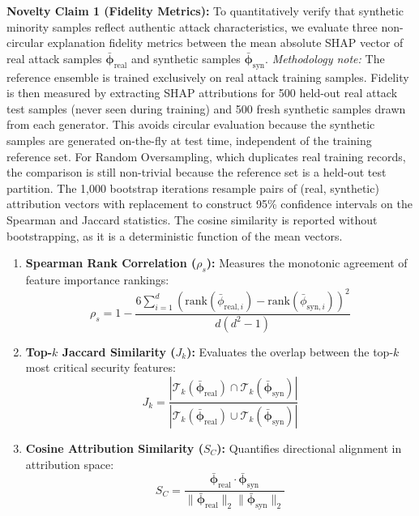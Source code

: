 \documentclass[journal]{IEEEtran}
\begin{document}
\textbf{Novelty Claim 1 (Fidelity Metrics):} To quantitatively verify that synthetic minority samples reflect authentic attack characteristics, we evaluate three non-circular explanation fidelity metrics between the mean absolute SHAP vector of real attack samples $\bar{\boldsymbol{\phi}}_{\text{real}}$ and synthetic samples $\bar{\boldsymbol{\phi}}_{\text{syn}}$. \textit{Methodology note:} The reference ensemble is trained exclusively on real attack training samples. Fidelity is then measured by extracting SHAP attributions for 500 held-out real attack test samples (never seen during training) and 500 fresh synthetic samples drawn from each generator. This avoids circular evaluation because the synthetic samples are generated on-the-fly at test time, independent of the training reference set. For Random Oversampling, which duplicates real training records, the comparison is still non-trivial because the reference set is a held-out test partition. The 1,000 bootstrap iterations resample pairs of (real, synthetic) attribution vectors with replacement to construct 95\% confidence intervals on the Spearman and Jaccard statistics. The cosine similarity is reported without bootstrapping, as it is a deterministic function of the mean vectors.
\begin{enumerate}
    \item \textbf{Spearman Rank Correlation ($\rho_s$):} Measures the monotonic agreement of feature importance rankings:
    \begin{equation}
    \rho_s = 1 - \frac{6 \sum_{i=1}^d (\text{rank}(\bar{\phi}_{\text{real}, i}) - \text{rank}(\bar{\phi}_{\text{syn}, i}))^2}{d(d^2 - 1)}
    \label{eq:spearman}
    \end{equation}
    \item \textbf{Top-$k$ Jaccard Similarity ($J_k$):} Evaluates the overlap between the top-$k$ most critical security features:
    \begin{equation}
    J_k = \frac{|\mathcal{T}_k(\bar{\boldsymbol{\phi}}_{\text{real}}) \cap \mathcal{T}_k(\bar{\boldsymbol{\phi}}_{\text{syn}})|}{|\mathcal{T}_k(\bar{\boldsymbol{\phi}}_{\text{real}}) \cup \mathcal{T}_k(\bar{\boldsymbol{\phi}}_{\text{syn}})|}
    \label{eq:jaccard}
    \end{equation}
    \item \textbf{Cosine Attribution Similarity ($S_C$):} Quantifies directional alignment in attribution space:
    \begin{equation}
    S_C = \frac{\bar{\boldsymbol{\phi}}_{\text{real}} \cdot \bar{\boldsymbol{\phi}}_{\text{syn}}}{\|\bar{\boldsymbol{\phi}}_{\text{real}}\|_2 \|\bar{\boldsymbol{\phi}}_{\text{syn}}\|_2}
    \label{eq:cosine}
    \end{equation}
\end{enumerate}
\end{document}
